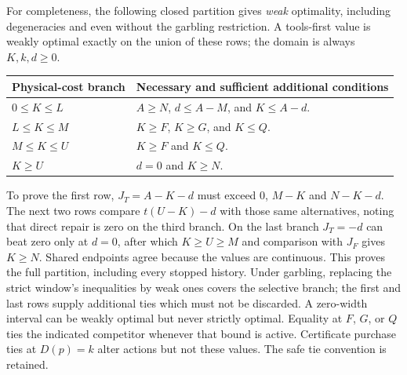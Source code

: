For completeness, the following closed partition gives \emph{weak} optimality, including degeneracies and even without the garbling restriction. A tools-first value is weakly optimal exactly on the union of these rows; the domain is always $K,k,d\geq0$.
\begin{center}\small
\begin{tabular}{p{.20\linewidth}p{.70\linewidth}}
\toprule Physical-cost branch & Necessary and sufficient additional conditions\\\midrule
$0\leq K\leq L$ & $A\geq N$, $d\leq A-M$, and $K\leq A-d$.\\
$L\leq K\leq M$ & $K\geq F$, $K\geq G$, and $K\leq Q$.\\
$M\leq K\leq U$ & $K\geq F$ and $K\leq Q$.\\
$K\geq U$ & $d=0$ and $K\geq N$.\\\bottomrule
\end{tabular}
\end{center}
To prove the first row, $J_T=A-K-d$ must exceed $0$, $M-K$ and $N-K-d$. The next two rows compare $t(U-K)-d$ with those same alternatives, noting that direct repair is zero on the third branch. On the last branch $J_T=-d$ can beat zero only at $d=0$, after which $K\geq U\geq M$ and comparison with $J_F$ gives $K\geq N$. Shared endpoints agree because the values are continuous. This proves the full partition, including every stopped history. Under garbling, replacing the strict window's inequalities by weak ones covers the selective branch; the first and last rows supply additional ties which must not be discarded. A zero-width interval can be weakly optimal but never strictly optimal. Equality at $F$, $G$, or $Q$ ties the indicated competitor whenever that bound is active. Certificate purchase ties at $D(p)=k$ alter actions but not these values. The safe tie convention is retained.

